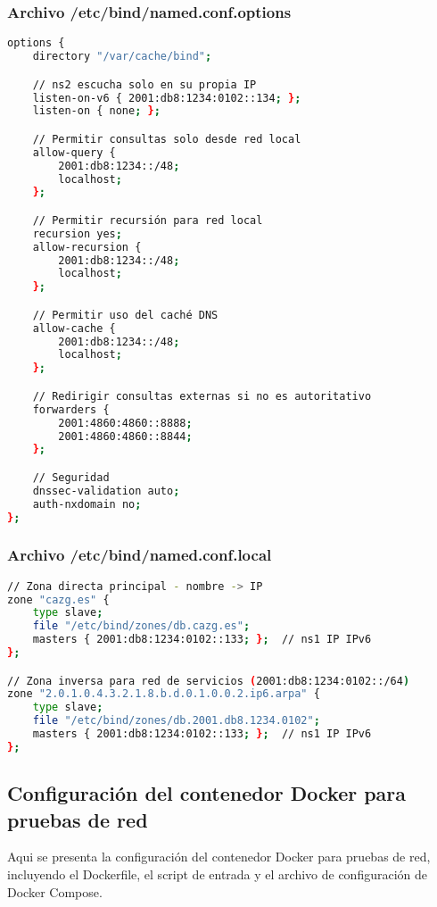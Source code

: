 \subsubsection{Archivo /etc/bind/named.conf.options}
\label{Apendice2:named.conf.options_dns2}
\begin{lstlisting}[language=bash]
options {
    directory "/var/cache/bind";

    // ns2 escucha solo en su propia IP
    listen-on-v6 { 2001:db8:1234:0102::134; };
    listen-on { none; };

    // Permitir consultas solo desde red local
    allow-query {
        2001:db8:1234::/48;
        localhost;
    };

    // Permitir recursión para red local
    recursion yes;
    allow-recursion {
        2001:db8:1234::/48;
        localhost;
    };

    // Permitir uso del caché DNS
    allow-cache {
        2001:db8:1234::/48;
        localhost;
    };

    // Redirigir consultas externas si no es autoritativo
    forwarders {
        2001:4860:4860::8888;
        2001:4860:4860::8844;
    };

    // Seguridad
    dnssec-validation auto;
    auth-nxdomain no;
};

\end{lstlisting}

\subsubsection{Archivo /etc/bind/named.conf.local}
\label{Apendice2:named.conf.local_dns2}
\begin{lstlisting}[language=bash]
// Zona directa principal - nombre -> IP
zone "cazg.es" {
    type slave;
    file "/etc/bind/zones/db.cazg.es";
    masters { 2001:db8:1234:0102::133; };  // ns1 IP IPv6
};

// Zona inversa para red de servicios (2001:db8:1234:0102::/64)
zone "2.0.1.0.4.3.2.1.8.b.d.0.1.0.0.2.ip6.arpa" {
    type slave;
    file "/etc/bind/zones/db.2001.db8.1234.0102"; 
    masters { 2001:db8:1234:0102::133; };  // ns1 IP IPv6
}; 
\end{lstlisting}

\subsection{Configuración del contenedor Docker para pruebas de red}
\label{Apendice2:configuracion_contenedor_red}
Aqui se presenta la configuración del contenedor Docker para pruebas de red, incluyendo el Dockerfile, el script de entrada y el archivo de configuración de Docker Compose.

